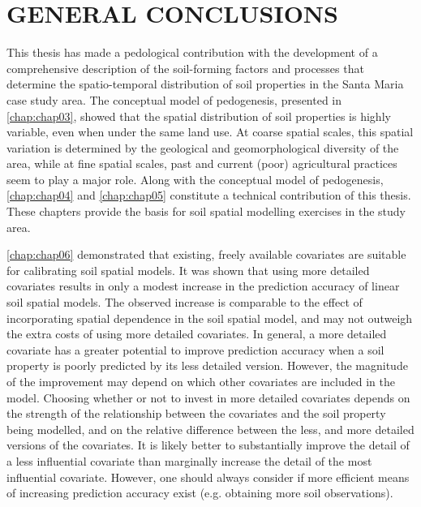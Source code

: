 \artigofalse
\chapter{GENERAL CONCLUSIONS}
\label{chap:chap10}

This thesis has made a pedological contribution with the development of a comprehensive description of the 
soil-forming factors and processes that determine the spatio-temporal distribution of soil properties in the 
Santa Maria case study area. The conceptual model of pedogenesis, presented in \autoref{chap:chap03}, showed 
that the spatial distribution of soil properties is highly variable, even when under the same land use. At 
coarse spatial scales, this spatial variation is determined by the geological and geomorphological diversity of 
the area, while at fine spatial scales, past and current (poor) agricultural practices seem to play a major 
role. Along with the conceptual model of pedogenesis, \autoref{chap:chap04} and \autoref{chap:chap05} 
constitute a technical contribution of this thesis. These chapters provide the basis for soil spatial modelling 
exercises in the study area.

\autoref{chap:chap06} demonstrated that existing, freely available covariates are suitable for calibrating soil 
spatial models. It was shown that using more detailed covariates results in only a modest increase in the 
prediction accuracy of linear soil spatial models. The observed increase is comparable to the effect of 
incorporating spatial dependence in the soil spatial model, and may not outweigh the extra costs of using more 
detailed covariates. In general, a more detailed covariate has a greater potential to improve 
prediction accuracy when a soil property is poorly predicted by its less detailed version. However, the 
magnitude of the improvement may depend on which other covariates are included in the model. Choosing whether 
or not to invest in more detailed covariates depends on the strength of the relationship between the covariates 
and the soil property being modelled, and on the relative difference between the less, and more detailed 
versions of the covariates. It is likely better to substantially improve the detail of a less influential 
covariate than marginally increase the detail of the most influential covariate. However, one should always 
consider if more efficient means of increasing prediction accuracy exist (e.g. obtaining more soil 
observations).

